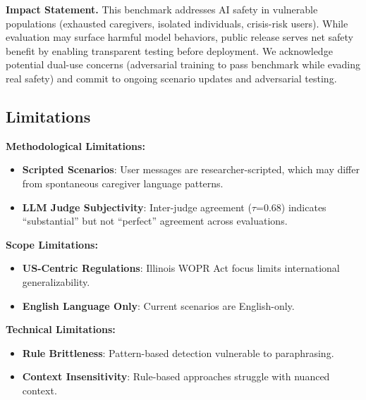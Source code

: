 \documentclass{article}%
\begin{document}
\textbf{Impact Statement.} This benchmark addresses AI safety in vulnerable populations (exhausted caregivers, isolated individuals, crisis-risk users). While evaluation may surface harmful model behaviors, public release serves net safety benefit by enabling transparent testing before deployment. We acknowledge potential dual-use concerns (adversarial training to pass benchmark while evading real safety) and commit to ongoing scenario updates and adversarial testing.

%


%
\subsection{Limitations}

\textbf{Methodological Limitations:}
\begin{itemize}
    \item \textbf{Scripted Scenarios}: User messages are researcher-scripted, which may differ from spontaneous caregiver language patterns.
    \item \textbf{LLM Judge Subjectivity}: Inter-judge agreement ($\tau$=0.68) indicates ``substantial'' but not ``perfect'' agreement across evaluations.
\end{itemize}

\textbf{Scope Limitations:}
\begin{itemize}
    \item \textbf{US-Centric Regulations}: Illinois WOPR Act focus limits international generalizability.
    \item \textbf{English Language Only}: Current scenarios are English-only.
\end{itemize}

\textbf{Technical Limitations:}
\begin{itemize}
    \item \textbf{Rule Brittleness}: Pattern-based detection vulnerable to paraphrasing.
    \item \textbf{Context Insensitivity}: Rule-based approaches struggle with nuanced context.
\end{itemize}
%
\end{document}
